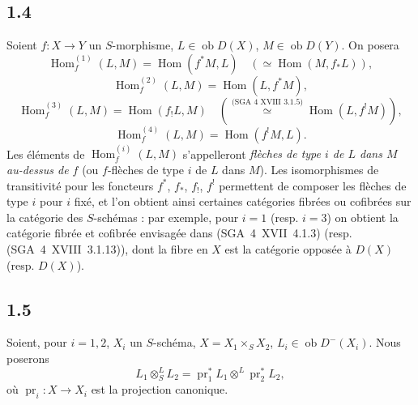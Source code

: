 \documentclass[11pt]{article}
\DeclareMathOperator{\Hom}{Hom}
\newcommand{\ob}{\operatorname{ob}}
\providecommand{\pr}{\operatorname{pr}}
\providecommand{\Hom}{\operatorname{Hom}}
\providecommand{\ob}{\operatorname{ob}}
\providecommand{\pr}{\operatorname{pr}}
\providecommand{\Hom}{\operatorname{Hom}}
\begin{document}
\subsection*{1.4}
Soient $f:X\to Y$ un $S$-morphisme, $L\in\ob D(X)$, $M\in\ob D(Y)$. On posera
\[
\Hom_f^{(1)}(L,M)=\Hom(f^{*}M,L)\quad (\simeq \Hom(M,f_{*}L)),
\]
\[
\Hom_f^{(2)}(L,M)=\Hom(L,f^{*}M),
\]
\[
\Hom_f^{(3)}(L,M)=\Hom(f_{!}L,M)\quad (\overset{\text{(SGA~4~XVIII~3.1.5)}}{\simeq} \Hom(L,f^{!}M)),
\]
\[
\Hom_f^{(4)}(L,M)=\Hom(f^{!}M,L).
\]
Les éléments de $\Hom_f^{(i)}(L,M)$ s'appelleront \emph{flèches de type $i$ de $L$ dans $M$ au-dessus de $f$} (ou $f$-flèches de type $i$ de $L$ dans $M$). Les isomorphismes de transitivité pour les foncteurs $f^{*}$, $f_{*}$, $f_{!}$, $f^{!}$ permettent de composer les flèches de type $i$ pour $i$ fixé, et l'on obtient ainsi certaines catégories fibrées ou cofibrées sur la catégorie des $S$-schémas : par exemple, pour $i=1$ (resp. $i=3$) on obtient la catégorie fibrée et cofibrée envisagée dans (SGA~4~XVII~4.1.3) (resp. (SGA~4~XVIII~3.1.13)), dont la fibre en $X$ est la catégorie opposée à $D(X)$ (resp. $D(X)$).

\subsection*{1.5}
Soient, pour $i=1,2$, $X_i$ un $S$-schéma, $X=X_1\times_S X_2$, $L_i\in\ob D^{-}(X_i)$. Nous poserons
\[
L_1\otimes^{L}_{S}L_2=\pr_1^{*}L_1\otimes^{L}\pr_2^{*}L_2,
\]
où $\pr_i:X\to X_i$ est la projection canonique.
\end{document}
